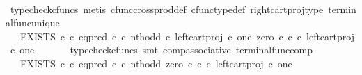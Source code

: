 \begin{isabellebody}
\ \ \ \ \isamarkupfalse%
\ {\isacharparenleft}{\kern0pt}typecheck{\isacharunderscore}{\kern0pt}cfuncs{\isacharcomma}{\kern0pt}\ metis\ cfunc{\isacharunderscore}{\kern0pt}cross{\isacharunderscore}{\kern0pt}prod{\isacharunderscore}{\kern0pt}def\ cfunc{\isacharunderscore}{\kern0pt}type{\isacharunderscore}{\kern0pt}def\ right{\isacharunderscore}{\kern0pt}cart{\isacharunderscore}{\kern0pt}proj{\isacharunderscore}{\kern0pt}type\ terminal{\isacharunderscore}{\kern0pt}func{\isacharunderscore}{\kern0pt}unique{\isacharparenright}{\kern0pt}\isanewline
\ \ \isamarkupfalse%
\ \isamarkupfalse%
\ {\isachardoublequoteopen}{\isachardot}{\kern0pt}{\isachardot}{\kern0pt}{\isachardot}{\kern0pt}\ {\isacharequal}{\kern0pt}\ EXISTS\ {\isasymnat}\isactrlsub c\ {\isasymcirc}\isactrlsub c\ {\isacharparenleft}{\kern0pt}eq{\isacharunderscore}{\kern0pt}pred\ {\isasymnat}\isactrlsub c\ {\isasymcirc}\isactrlsub c\ {\isasymlangle}nth{\isacharunderscore}{\kern0pt}odd\ {\isasymcirc}\isactrlsub c\ left{\isacharunderscore}{\kern0pt}cart{\isacharunderscore}{\kern0pt}proj\ {\isasymnat}\isactrlsub c\ one{\isacharcomma}{\kern0pt}\ {\isacharparenleft}{\kern0pt}zero\ {\isasymcirc}\isactrlsub c\ {\isasymbeta}\isactrlbsub {\isasymnat}\isactrlsub c\isactrlesub {\isacharparenright}{\kern0pt}\ {\isasymcirc}\isactrlsub c\ left{\isacharunderscore}{\kern0pt}cart{\isacharunderscore}{\kern0pt}proj\ {\isasymnat}\isactrlsub c\ one{\isasymrangle}\ {\isacharparenright}{\kern0pt}\isactrlsup {\isasymsharp}{\isachardoublequoteclose}\isanewline
\ \ \ \ \isamarkupfalse%
\ {\isacharparenleft}{\kern0pt}typecheck{\isacharunderscore}{\kern0pt}cfuncs{\isacharcomma}{\kern0pt}\ smt\ comp{\isacharunderscore}{\kern0pt}associative{}\ terminal{\isacharunderscore}{\kern0pt}func{\isacharunderscore}{\kern0pt}comp{\isacharparenright}{\kern0pt}\isanewline
\ \ \isamarkupfalse%
\ \isamarkupfalse%
\ {\isachardoublequoteopen}{\isachardot}{\kern0pt}{\isachardot}{\kern0pt}{\isachardot}{\kern0pt}\ {\isacharequal}{\kern0pt}\ EXISTS\ {\isasymnat}\isactrlsub c\ {\isasymcirc}\isactrlsub c\ {\isacharparenleft}{\kern0pt}{\isacharparenleft}{\kern0pt}eq{\isacharunderscore}{\kern0pt}pred\ {\isasymnat}\isactrlsub c\ {\isasymcirc}\isactrlsub c\ {\isasymlangle}nth{\isacharunderscore}{\kern0pt}odd{\isacharcomma}{\kern0pt}\ zero\ {\isasymcirc}\isactrlsub c\ {\isasymbeta}\isactrlbsub {\isasymnat}\isactrlsub c\isactrlesub {\isasymrangle}{\isacharparenright}{\kern0pt}\ {\isasymcirc}\isactrlsub c\ left{\isacharunderscore}{\kern0pt}cart{\isacharunderscore}{\kern0pt}proj\ {\isasymnat}\isactrlsub c\ one{\isacharparenright}{\kern0pt}\isactrlsup {\isasymsharp}{\isachardoublequoteclose}\isanewline

\end{isabellebody}
